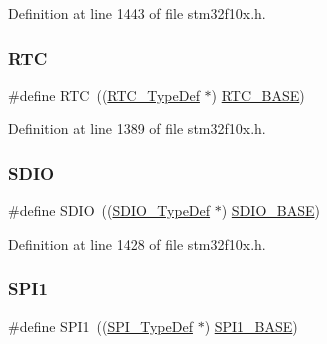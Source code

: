 Definition at line 1443 of file stm32f10x.\+h.

\mbox{\label{group___peripheral__declaration_ga5359a088f5d8b20ce74d920e46059304}} 
\subsubsection{\texorpdfstring{R\+TC}{RTC}}
{\footnotesize\ttfamily \#define R\+TC~((\hyperlink{struct_r_t_c___type_def}{R\+T\+C\+\_\+\+Type\+Def} $\ast$) \hyperlink{group___peripheral__memory__map_ga4265e665d56225412e57a61d87417022}{R\+T\+C\+\_\+\+B\+A\+SE})}



Definition at line 1389 of file stm32f10x.\+h.

\mbox{\label{group___peripheral__declaration_ga8149aa2760fffac16bc75216d5fd9331}} 
\subsubsection{\texorpdfstring{S\+D\+IO}{SDIO}}
{\footnotesize\ttfamily \#define S\+D\+IO~((\hyperlink{struct_s_d_i_o___type_def}{S\+D\+I\+O\+\_\+\+Type\+Def} $\ast$) \hyperlink{group___peripheral__memory__map_ga95dd0abbc6767893b4b02935fa846f52}{S\+D\+I\+O\+\_\+\+B\+A\+SE})}



Definition at line 1428 of file stm32f10x.\+h.

\mbox{\label{group___peripheral__declaration_gad483be344a28ac800be8f03654a9612f}} 
\subsubsection{\texorpdfstring{S\+P\+I1}{SPI1}}
{\footnotesize\ttfamily \#define S\+P\+I1~((\hyperlink{struct_s_p_i___type_def}{S\+P\+I\+\_\+\+Type\+Def} $\ast$) \hyperlink{group___peripheral__memory__map_ga50cd8b47929f18b05efbd0f41253bf8d}{S\+P\+I1\+\_\+\+B\+A\+SE})}



